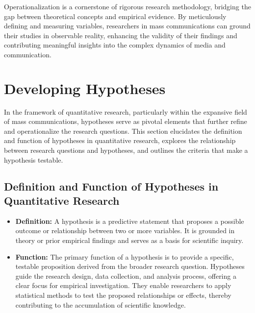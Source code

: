 \documentclass[
]{book}
\begin{document}
Operationalization is a cornerstone of rigorous research methodology, bridging the gap between theoretical concepts and empirical evidence. By meticulously defining and measuring variables, researchers in mass communications can ground their studies in observable reality, enhancing the validity of their findings and contributing meaningful insights into the complex dynamics of media and communication.

\hypertarget{developing-hypotheses}{%
\section{Developing Hypotheses}\label{developing-hypotheses}}

In the framework of quantitative research, particularly within the expansive field of mass communications, hypotheses serve as pivotal elements that further refine and operationalize the research questions. This section elucidates the definition and function of hypotheses in quantitative research, explores the relationship between research questions and hypotheses, and outlines the criteria that make a hypothesis testable.

\hypertarget{definition-and-function-of-hypotheses-in-quantitative-research}{%
\subsection*{Definition and Function of Hypotheses in Quantitative Research}\label{definition-and-function-of-hypotheses-in-quantitative-research}}

\begin{itemize}
\item
  \textbf{Definition:} A hypothesis is a predictive statement that proposes a possible outcome or relationship between two or more variables. It is grounded in theory or prior empirical findings and serves as a basis for scientific inquiry.
\item
  \textbf{Function:} The primary function of a hypothesis is to provide a specific, testable proposition derived from the broader research question. Hypotheses guide the research design, data collection, and analysis process, offering a clear focus for empirical investigation. They enable researchers to apply statistical methods to test the proposed relationships or effects, thereby contributing to the accumulation of scientific knowledge.
\end{itemize}
\end{document}
